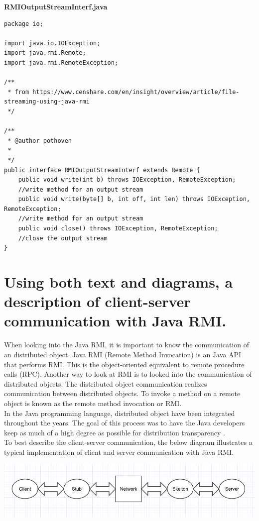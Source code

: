 \documentclass{article}
\begin{document}
\textbf{RMIOutputStreamInterf.java}

\begin{lstlisting}
package io;

import java.io.IOException;
import java.rmi.Remote;
import java.rmi.RemoteException;

/**
 * from https://www.censhare.com/en/insight/overview/article/file-streaming-using-java-rmi
 */

/**
 * @author pothoven
 *
 */
public interface RMIOutputStreamInterf extends Remote {
    public void write(int b) throws IOException, RemoteException;
    //write method for an output stream
    public void write(byte[] b, int off, int len) throws IOException, RemoteException;
    //write method for an output stream
    public void close() throws IOException, RemoteException;
    //close the output stream
}

\end{lstlisting}



\section{Using both text and diagrams, a description of client-server communication with Java RMI.}

When looking into the Java RMI, it is important to know the communication of an distributed object. Java RMI (Remote Method Invocation) is an Java API that performs RMI. This is the object-oriented equivalent to remote procedure calls (RPC). Another way to look at RMI is to looked into the communication of distributed objects. The distributed object communication realizes communication between distributed objects. To invoke a method on a remote object is known as the remote method invocation or RMI.
\\
In the Java programming language, distributed object have been integrated throughout the years. The goal of this process was to have the Java developers keep as much of a high degree as possible for distribution transparency \citep{tanenbaum_steen_2007}.
\\
To best describe the client-server communication, the below diagram illustrates a typical implementation of client and server communication with Java RMI. 
\begin{center}
\includegraphics[scale=0.4]{javaRMI.png}
\end{center}
\end{document}
